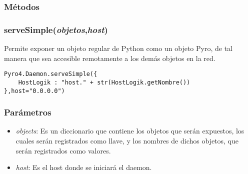 \documentclass{article}
\begin{document}
\subsubsection*{Métodos}
\subsubsection{\textbf{serveSimple}(\textit{objetos},\textit{host})}
Permite exponer un objeto regular de Python como un objeto Pyro, de tal manera que sea accesible remotamente a los demás objetos en la red.
\begin{lstlisting}
Pyro4.Daemon.serveSimple({
    HostLogik : "host." + str(HostLogik.getNombre())
},host="0.0.0.0")
\end{lstlisting}
\subsubsection*{Parámetros}
\begin{itemize}
\item \textit{objects}: Es un diccionario que contiene los objetos que serán expuestos, los cuales serán registrados como llave, y los nombres de dichos objetos, que serán registrados como valores.
\item \textit{host}: Es el host donde se iniciará el daemon.
\end{itemize}
\end{document}
